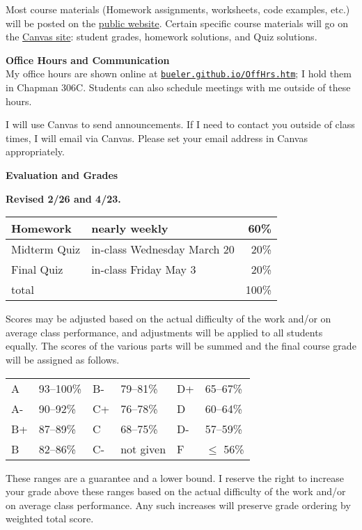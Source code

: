 \documentclass[12pt]{article}
\renewcommand{\emph}[1]{\textsf{\textbf{#1}}}
\newcommand{\localhead}[1]{\par\smallskip\textbf{#1} \smallskip\nobreak\\}%
\def\heading#1{\localhead{\large\emph{#1}}}
\begin{document}
Most course materials (Homework assignments, worksheets, code examples, etc.) will be posted on the \href{https://bueler.github.io/fa/}{public website}.  Certain specific course materials will go on the \href{https://canvas.alaska.edu/courses/18441}{Canvas site}: student grades, homework solutions, and Quiz solutions.


\clearpage\newpage
\phantom{foo}
\heading{Office Hours and Communication}
My office hours are shown online at \href{http://bueler.github.io/OffHrs.htm}{\texttt{bueler.github.io/OffHrs.htm}}; I hold them in Chapman 306C.  Students can also schedule meetings with me outside of these hours.

I will use Canvas to send announcements.  If I need to contact you outside of class times, I will email via Canvas.  Please set your email address in Canvas appropriately.


\heading{Evaluation and Grades}
\vskip -10pt

{\color{red} \textbf{\emph{Revised 2/26 and 4/23.}}}

\begin{tabular}{|l|l|r|}
\hline
Homework & nearly weekly & {\color{red} 60\%} \\
\hline
{\color{red} Midterm Quiz} & {\color{red} in-class Wednesday March 20} & {\color{red} 20\%}  \\
\hline
{\color{red} Final Quiz}   & in-class Friday May 3 & {\color{red} 20\%} \\
\hline
total & & 100\% \\
\hline
\end{tabular}

Scores may be adjusted based on the actual difficulty of the work and/or on average class performance, and adjustments will be applied to all students equally.  The scores of the various parts will be summed and the final course grade will be assigned as follows.

\begin{tabular}{llllll}
A  & 93--100\% & B- & 79--81\%  & D+ & 65--67\%  \\
A- & 90--92\%  & C+ & 76--78\%  & D  & 60--64\%  \\
B+ & 87--89\%  & C  & 68--75\%  & D- & 57--59\%  \\
B  & 82--86\%  & C- & not given & F  & $\le$ 56\%
\end{tabular}

These ranges are a guarantee and a lower bound.  I reserve the right to increase your grade above these ranges based on the actual difficulty of the work and/or on average class performance.  Any such increases will preserve grade ordering by weighted total score.
\end{document}
